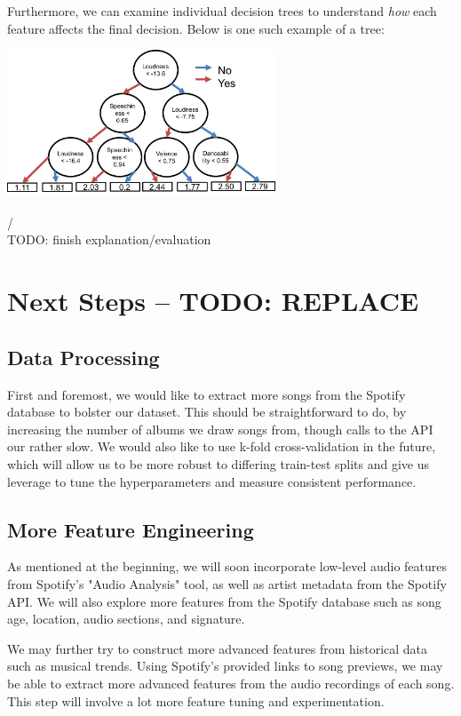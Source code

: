 \documentclass[journal]{IEEEtran}
\begin{document}
Furthermore, we can examine individual decision trees to understand \textit{how} each feature affects the final decision. Below is one such example of a tree: 

\includegraphics[width=8cm]{images/gbm_example_tree.png}

/\\TODO: finish explanation/evaluation 


\section{Next Steps -- TODO: REPLACE}

\subsection{Data Processing}
First and foremost, we would like to extract more songs from the Spotify database to bolster our dataset. This should be straightforward to do, by increasing the number of albums we draw songs from, though calls to the API our rather slow. We would also like to use k-fold cross-validation in the future, which will allow us to be more robust to differing train-test splits and give us leverage to tune the hyperparameters and measure consistent performance.

\subsection{More Feature Engineering}
As mentioned at the beginning, we will soon incorporate low-level audio features from Spotify's "Audio Analysis" tool, as well as artist metadata from the Spotify API. We will also explore more features from the Spotify database such as song age, location, audio sections, and signature.

We may further try to construct more advanced features from historical data such as musical trends. Using Spotify's provided links to song previews, we may be able to extract more advanced features from the audio recordings of each song. This step will involve a lot more feature tuning and experimentation.
\end{document}
